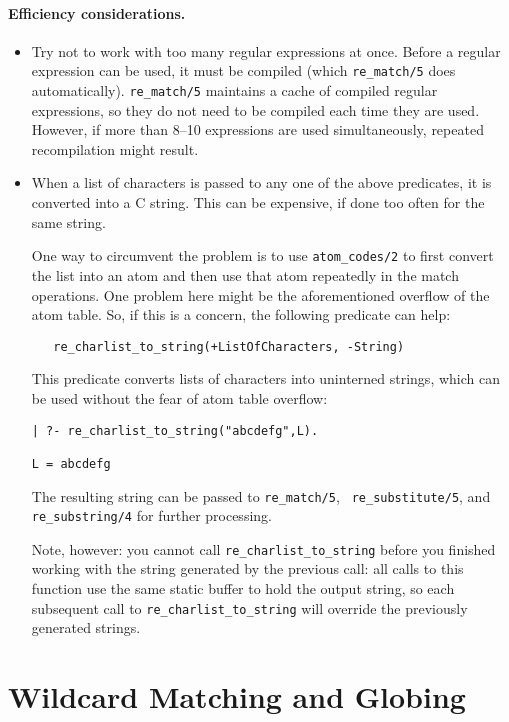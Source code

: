 \paragraph{Efficiency considerations.}
\begin{itemize}
  \item  Try not to work with too many regular expressions at once.
    Before a regular expression can be used, it must be compiled (which
    {\tt re\_match/5} does automatically).
    {\tt re\_match/5} maintains a cache of compiled regular expressions, so
    they do not need to be compiled each time they are used. However, if
    more than 8--10 expressions are used simultaneously, repeated
    recompilation might result.
  \item When a list of characters is passed to any one of the above
    predicates, it is converted into a C string. This can be expensive, if
    done too often for the same string.

    One way to circumvent the problem is to use {\tt atom\_codes/2} to first
    convert the list into an atom and then use that atom repeatedly in the
    match operations. One problem here might be the aforementioned overflow
    of the atom table. So, if this is a concern, the following predicate can
    help:
\begin{verbatim}
   re_charlist_to_string(+ListOfCharacters, -String)  
\end{verbatim}
    This predicate converts lists of characters into uninterned strings,
    which can be used without the fear of atom table overflow:
\begin{verbatim}
| ?- re_charlist_to_string("abcdefg",L).

L = abcdefg  
\end{verbatim}
    The resulting string can be passed to {\tt re\_match/5}, {\tt
    re\_substitute/5}, and {\tt re\_substring/4} for further processing.
  
  Note, however: you cannot call {\tt re\_charlist\_to\_string} before you
  finished working with the string generated by the previous call: all
  calls to this function use the same static buffer to hold the output
  string, so each subsequent call to {\tt re\_charlist\_to\_string} will
  override the previously generated strings.
\end{itemize}


\section{Wildcard Matching and Globing}


